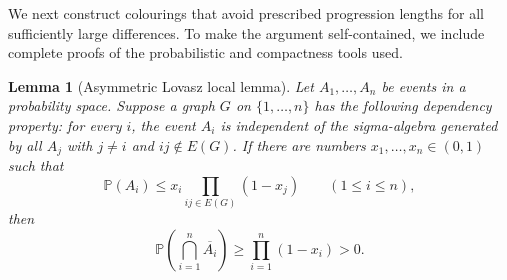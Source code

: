 \documentclass[11pt]{article}
\newtheorem{lemma}[theorem]{Lemma}
\theoremstyle{definition}
\theoremstyle{remark}
\begin{document}
We next construct colourings that avoid prescribed progression lengths for all sufficiently large differences. To make the argument self-contained, we include complete proofs of the probabilistic and compactness tools used.

\begin{lemma}[Asymmetric Lovasz local lemma]\label{lem:alll}
Let $A_1,\ldots,A_n$ be events in a probability space. Suppose a graph $G$ on $\{1,\ldots,n\}$ has the following dependency property: for every $i$, the event $A_i$ is independent of the sigma-algebra generated by all $A_j$ with $j\ne i$ and $ij\notin E(G)$. If there are numbers $x_1,\ldots,x_n\in(0,1)$ such that
\begin{equation}\label{eq:alll-condition}
\mathbb P(A_i)\le x_i\prod_{ij\in E(G)}(1-x_j)
\qquad(1\le i\le n),
\end{equation}
then
\[
\mathbb P\left(\bigcap_{i=1}^n\overline{A_i}\right)
\ge\prod_{i=1}^n(1-x_i)>0.
\]
\end{lemma}
\end{document}
